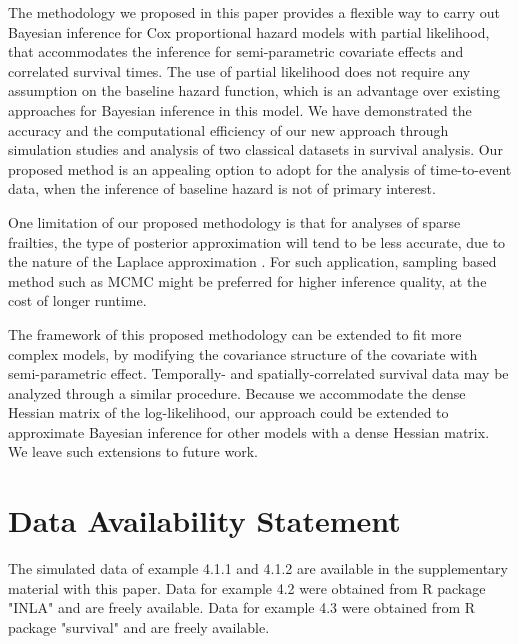 \documentclass[ba]{imsart}
\begin{document}
The methodology we proposed in this paper provides a flexible way to carry out Bayesian inference for Cox proportional hazard models with partial likelihood, that accommodates the inference for semi-parametric covariate effects and correlated survival times. The use of partial likelihood does not require any assumption on the baseline hazard function, which is an advantage over existing approaches for Bayesian inference in this model. We have demonstrated the accuracy and the computational efficiency of our new approach through simulation studies and analysis of two classical datasets in survival analysis. Our proposed method is an appealing option to adopt for the analysis of time-to-event data, when the inference of baseline hazard is not of primary interest.

One limitation of our proposed methodology is that for analyses of sparse frailties, the type of posterior approximation will tend to be less accurate, due to the nature of the Laplace approximation \citep{Ogden2013ASR}. For such application, sampling based method such as MCMC might be preferred for higher inference quality, at the cost of longer runtime. 

The framework of this proposed methodology can be extended to fit more complex models, by modifying the covariance structure of the covariate with semi-parametric effect. Temporally- and spatially-correlated survival data may be analyzed through a similar procedure. Because we accommodate the dense Hessian matrix of the log-likelihood, our approach could be extended to approximate Bayesian inference for other models with a dense Hessian matrix. We leave such extensions to future work.

\section*{Data Availability Statement}
The simulated data of example 4.1.1 and 4.1.2 are available in the supplementary material with this paper. Data for example 4.2 were obtained from R package "INLA" \citep{inla} and are freely available.
Data for example 4.3 were obtained from R package "survival" \citep{survival-package} and are freely available. 


\nocite{*}%

%

\clearpage
\end{document}
